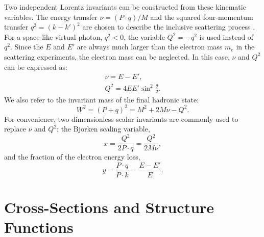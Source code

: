 Two independent Lorentz invariants can be constructed from these kinematic variables. The energy transfer $\nu=(P\cdot q)/M$ and the squared four-momentum transfer $q^2=(k-k')^2$ are chosen to describe the inclusive scattering process \cite{Halzen1984}. For a space-like virtual photon, $q^2<0$, the variable $Q^2=-q^2$ is used instead of $q^2$. Since the $E$ and $E'$ are always much larger than the electron mass $m_e$ in the scattering experiments, the electron mass can be neglected. In this case, $\nu$ and $Q^2$ can be expressed as:
\begin{gather} \label{C2S1E1}
\nu = E-E', \\ \label{C2S1E2}
Q^2 = 4EE'\sin^2\frac{\theta}{2}.
\end{gather}
We also refer to the invariant mass of the final hadronic state:
\begin{equation} \label{C2S1E3}
W^2 = (P+q)^2 = M^2+2M\nu-Q^2.
\end{equation}
For convenience, two dimensionless scalar invariants are commonly used to replace $\nu$ and $Q^2$: the Bjorken scaling variable,
\begin{equation}  \label{C2S1E4}
x = \frac{Q^2}{2P\cdot q}=\frac{Q^2}{2M\nu},
\end{equation}
and the fraction of the electron energy loss,
\begin{equation} \label{C2S1E5}
y = \frac{P\cdot q}{P\cdot k}=\frac{E-E'}{E}.
\end{equation}

\hspace{1cm} \newline

\section{Cross-Sections and Structure Functions}
\label{C2S2}

